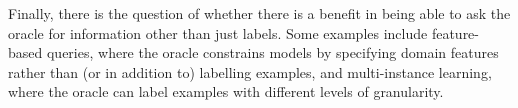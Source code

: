 \documentclass[a4paper]{article}
\begin{document}
        Finally, there is the question of whether there is a benefit in being able to ask the oracle for information other than just labels. Some examples include feature-based queries, where the oracle constrains models by specifying domain features rather than (or in addition to) labelling examples\cite{settles11,raghavan06}, and multi-instance learning, where the oracle can label examples with different levels of granularity\cite{settles08}.





\end{document}
